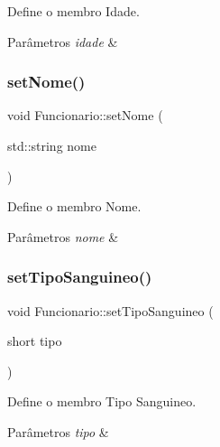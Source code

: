 Define o membro Idade. 


\begin{DoxyParams}{Parâmetros}
{\em idade} & \\
\hline
\end{DoxyParams}
\mbox{\label{classFuncionario_a32e01bd23e422ab7598cd04dac51eb82}} 
\subsubsection{\texorpdfstring{set\+Nome()}{setNome()}}
{\footnotesize\ttfamily void Funcionario\+::set\+Nome (\begin{DoxyParamCaption}\item[{std\+::string}]{nome }\end{DoxyParamCaption})}



Define o membro Nome. 


\begin{DoxyParams}{Parâmetros}
{\em nome} & \\
\hline
\end{DoxyParams}
\mbox{\label{classFuncionario_a3e690d80c156f121598a28fb41de7aa1}} 
\subsubsection{\texorpdfstring{set\+Tipo\+Sanguineo()}{setTipoSanguineo()}}
{\footnotesize\ttfamily void Funcionario\+::set\+Tipo\+Sanguineo (\begin{DoxyParamCaption}\item[{short}]{tipo }\end{DoxyParamCaption})}



Define o membro Tipo Sanguineo. 


\begin{DoxyParams}{Parâmetros}
{\em tipo} & \\
\hline
\end{DoxyParams}
\mbox{\label{classFuncionario_a72916b5b2b096630ebc93e4301ee7437}} 
